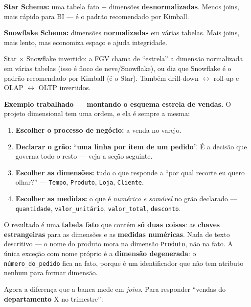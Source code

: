 \begin{conceito}
\textbf{Star Schema:} uma tabela fato + dimensões \textbf{desnormalizadas}.
Menos joins, mais rápido para BI --- é o padrão recomendado por Kimball.

\textbf{Snowflake Schema:} dimensões \textbf{normalizadas} em várias tabelas.
Mais joins, mais lento, mas economiza espaço e ajuda integridade.
\end{conceito}

\begin{pegadinha}
Star $\times$ Snowflake invertido: a FGV chama de ``estrela'' a dimensão
normalizada em várias tabelas (isso é floco de neve/Snowflake), ou diz que
Snowflake é o padrão recomendado por Kimball (é o Star). Também drill-down
$\leftrightarrow$ roll-up e OLAP $\leftrightarrow$ OLTP invertidos.
\end{pegadinha}

\textbf{Exemplo trabalhado --- montando o esquema estrela de vendas.} O projeto
dimensional tem uma ordem, e ela é sempre a mesma:

\begin{enumerate}
\item \textbf{Escolher o processo de negócio:} a venda no varejo.
\item \textbf{Declarar o grão:} ``\textbf{uma linha por item de um pedido}''.
É a decisão que governa todo o resto --- veja a seção seguinte.
\item \textbf{Escolher as dimensões:} tudo o que responde a ``por qual
recorte eu quero olhar?'' --- \texttt{Tempo}, \texttt{Produto}, \texttt{Loja},
\texttt{Cliente}.
\item \textbf{Escolher as medidas:} o que é \emph{numérico e somável} no grão
declarado --- \texttt{quantidade}, \texttt{valor\_unitário},
\texttt{valor\_total}, \texttt{desconto}.
\end{enumerate}

O resultado é uma \textbf{tabela fato} que contém \textbf{só duas coisas}: as
\textbf{chaves estrangeiras} para as dimensões e as \textbf{medidas
numéricas}. Nada de texto descritivo --- o nome do produto mora na dimensão
\texttt{Produto}, não na fato. A única exceção com nome próprio é a
\textbf{dimensão degenerada}: o \texttt{número\_do\_pedido} fica na fato,
porque é um identificador que não tem atributo nenhum para formar dimensão.

Agora a diferença que a banca mede em \emph{joins}. Para responder ``vendas do
\textbf{departamento} X no trimestre'':


